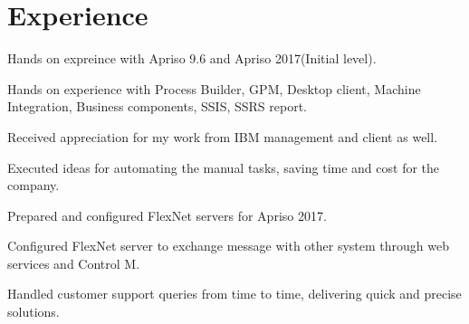 \documentclass[]{deedy-resume-openfont}
\begin{document}
\hfill
\begin{minipage}[t]{0.66\textwidth} 


\section{Experience}

\vspace{\topsep} %
\begin{tightemize}
\item Hands on expreince with Apriso 9.6 and Apriso 2017(Initial level).
\item Hands on experience with Process Builder, GPM, Desktop client, Machine Integration, Business components, SSIS, SSRS report.
\item Received appreciation for my work from IBM management and client as well.
\item Executed ideas for automating the manual tasks, saving time and cost for the company.
\item Prepared and configured FlexNet servers for Apriso 2017.
\item Configured FlexNet server to exchange message with other system through web services and Control M.
\item Handled customer support queries from time to time, delivering quick and precise solutions.
\end{tightemize}
\sectionsep



\end{minipage}
\end{document}
